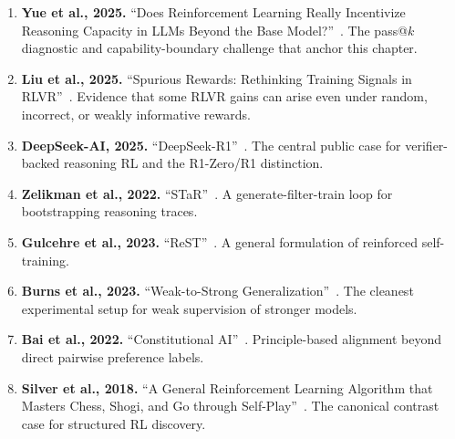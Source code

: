 \begin{enumerate}[nosep]
  \item \textbf{Yue et al., 2025.} ``Does Reinforcement Learning Really Incentivize Reasoning Capacity in LLMs Beyond the Base Model?''~\cite{yue2025rlreasoning}. The pass@$k$ diagnostic and capability-boundary challenge that anchor this chapter.
  \item \textbf{Liu et al., 2025.} ``Spurious Rewards: Rethinking Training Signals in RLVR''~\cite{liu2025spurious}. Evidence that some RLVR gains can arise even under random, incorrect, or weakly informative rewards.
  \item \textbf{DeepSeek-AI, 2025.} ``DeepSeek-R1''~\cite{deepseekai2025r1}. The central public case for verifier-backed reasoning RL and the R1-Zero/R1 distinction.
  \item \textbf{Zelikman et al., 2022.} ``STaR''~\cite{zelikman2022star}. A generate-filter-train loop for bootstrapping reasoning traces.
  \item \textbf{Gulcehre et al., 2023.} ``ReST''~\cite{gulcehre2023rest}. A general formulation of reinforced self-training.
  \item \textbf{Burns et al., 2023.} ``Weak-to-Strong Generalization''~\cite{burns2023weak}. The cleanest experimental setup for weak supervision of stronger models.
  \item \textbf{Bai et al., 2022.} ``Constitutional AI''~\cite{bai2022constitutional}. Principle-based alignment beyond direct pairwise preference labels.
  \item \textbf{Silver et al., 2018.} ``A General Reinforcement Learning Algorithm that Masters Chess, Shogi, and Go through Self-Play''~\cite{silver2018alphazero}. The canonical contrast case for structured RL discovery.
\end{enumerate}

\flushbottom
